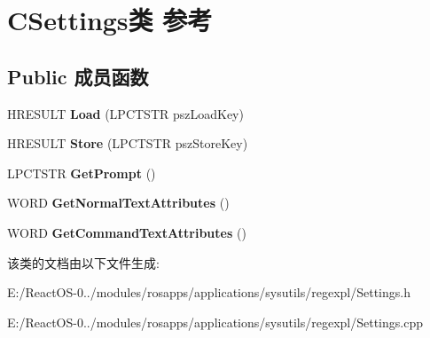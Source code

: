 \hypertarget{class_c_settings}{}\section{C\+Settings类 参考}
\label{class_c_settings}
\subsection*{Public 成员函数}
\begin{DoxyCompactItemize}
\item 
\mbox{\label{class_c_settings_a287b74f0d3cdfcf8069d04f947ea1eb2}} 
H\+R\+E\+S\+U\+LT {\bfseries Load} (L\+P\+C\+T\+S\+TR psz\+Load\+Key)
\item 
\mbox{\label{class_c_settings_abd9bdc85e8137c4a5a276ebae9173754}} 
H\+R\+E\+S\+U\+LT {\bfseries Store} (L\+P\+C\+T\+S\+TR psz\+Store\+Key)
\item 
\mbox{\label{class_c_settings_a3053bbabb6ca2ce6e2ace25ffc5456a6}} 
L\+P\+C\+T\+S\+TR {\bfseries Get\+Prompt} ()
\item 
\mbox{\label{class_c_settings_a98cd255e5cca738e88aaae67d9f5f032}} 
W\+O\+RD {\bfseries Get\+Normal\+Text\+Attributes} ()
\item 
\mbox{\label{class_c_settings_a860b0e7e586913ef3059d6ab1a4e5c5a}} 
W\+O\+RD {\bfseries Get\+Command\+Text\+Attributes} ()
\end{DoxyCompactItemize}


该类的文档由以下文件生成\+:\begin{DoxyCompactItemize}
\item 
E\+:/\+React\+O\+S-\/0../modules/rosapps/applications/sysutils/regexpl/Settings.\+h\item 
E\+:/\+React\+O\+S-\/0../modules/rosapps/applications/sysutils/regexpl/Settings.\+cpp\end{DoxyCompactItemize}
